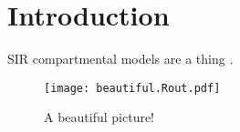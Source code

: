 \documentclass[12pt]{article}
\begin{document}
\section*{Introduction}

SIR compartmental models are a thing \cite{McKendrick1927,Anderson1991}. 

\begin{figure}
\texttt{[image: beautiful.Rout.pdf]}
\caption{ A beautiful picture! }
\end{figure}


 
\end{document}
